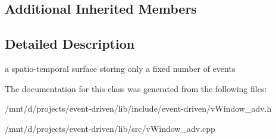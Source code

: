 \subsection*{Additional Inherited Members}


\subsection{Detailed Description}
a spatio-\/temporal surface storing only a fixed number of events 

The documentation for this class was generated from the following files\+:\begin{DoxyCompactItemize}
\item 
/mnt/d/projects/event-\/driven/lib/include/event-\/driven/v\+Window\+\_\+adv.\+h\item 
/mnt/d/projects/event-\/driven/lib/src/v\+Window\+\_\+adv.\+cpp\end{DoxyCompactItemize}
